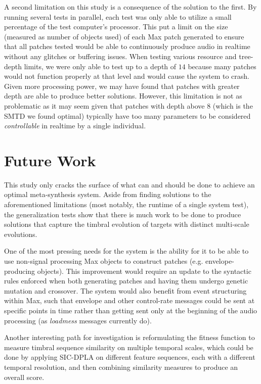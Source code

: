 \documentclass[12pt]{report} 	%
\numberwithin{figure}{chapter}
\numberwithin{table}{chapter}
\numberwithin{equation}{chapter}
\begin{document}
\begin{flushleft}
A second limitation on this study is a consequence of the solution to the first. By running several tests in parallel, each test was only able to utilize a small percentage of the test computer's processor. This put a limit on the size (measured as number of objects used) of each Max patch generated to ensure that all patches tested would be able to continuously produce audio in realtime without any glitches or buffering issues. When testing various resource and tree-depth limits, we were only able to test up to a depth of $14$ because many patches would not function properly at that level and would cause the system to crash. Given more processing power, we may have found that patches with greater depth are able to produce better solutions. However, this limitation is not as problematic as it may seem given that patches with depth above $8$ (which is the SMTD we found optimal) typically have too many parameters to be considered \textit{controllable} in realtime by a single individual.

\section{Future Work}
This study only cracks the surface of what can and should be done to achieve an optimal meta-synthesis system. Aside from finding solutions to the aforementioned limitations (most notably, the runtime of a single system test), the generalization tests show that there is much work to be done to produce solutions that capture the timbral evolution of targets with distinct multi-scale evolutions.

One of the most pressing needs for the system is the ability for it to be able to use non-signal processing Max objects to construct patches (e.g. envelope-producing objects). This improvement would require an update to the syntactic rules enforced when both generating patches and having them undergo genetic mutation and crossover. The system would also benefit from event structuring within Max, such that envelope and other control-rate messages could be sent at specific points in time rather than getting sent only at the beginning of the audio processing (as \textit{loadmess} messages currently do).

Another interesting path for investigation is reformulating the fitness function to measure timbral sequence similarity on multiple temporal scales, which could be done by applying SIC-DPLA on different feature sequences, each with a different temporal resolution, and then combining similarity measures to produce an overall score.


\end{flushleft}
\end{document}
